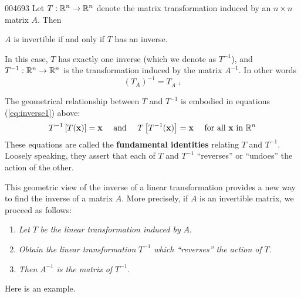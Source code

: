 \begin{theorem}{}{004693}
Let $T : \mathbb{R}^{n} \to \mathbb{R}^{n}$ denote the matrix transformation induced by an $n \times n$ matrix $A$. Then

\begin{center}
$A$ is invertible if and only if $T$ has an inverse.
\end{center}

In this case, $T$ has exactly one inverse (which we denote as $T^{-1}$), and $T^{-1} : \mathbb{R}^{n} \to \mathbb{R}^{n}$ is the transformation induced by the matrix $A^{-1}$. In other words
\begin{equation*}
\left(T_{A}\right)^{-1} = T_{A^{-1}}
\end{equation*}
\end{theorem}

\noindent The geometrical relationship between $T$ and $T^{-1}$ is embodied in equations (\ref{eq:inverse1}) above:
\begin{equation*}
T^{-1} \left[ T(\textbf{x}) \right] = \textbf{x} \quad \mbox{ and } \quad T \left[ T^{-1}(\textbf{x}) \right] = \textbf{x} \quad \mbox{ for all } \textbf{x} \mbox{ in } \mathbb{R}^{n}
\end{equation*}
These equations are called the \textbf{fundamental identities} relating $T$ and $T^{-1}$. Loosely speaking, they assert that each of $T$ and $T^{-1}$ ``reverses'' or ``undoes'' the action of the other.


This geometric view of the inverse of a linear transformation provides a new way to find the inverse of a matrix $A$. More precisely, if $A$ is an invertible matrix, we proceed as follows:


\begin{enumerate}
\item \textit{Let} $T$ \textit{be the linear transformation induced by} $A$.

\item \textit{Obtain the linear transformation} $T^{-1}$ \textit{which ``reverses'' the action of} $T$.

\item \textit{Then} $A^{-1}$ \textit{is the matrix of} $T^{-1}$.

\end{enumerate}

\noindent Here is an example.


